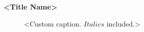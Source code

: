 
\begin{center}
\Large\textbf{<Title Name>}
\end{center}


\large{
\begin{figure}[htbp]
    \centering
    
    \caption{<Custom caption. $Italics$ included.>}
    \label{fig:svgImage}
\end{figure}
}

